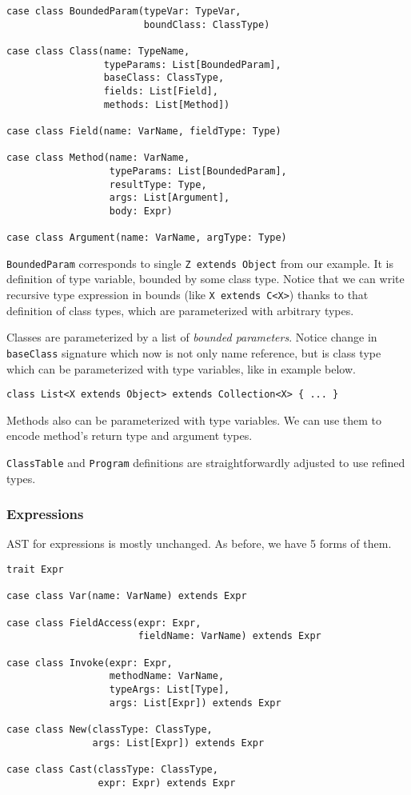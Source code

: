 \documentclass{article}[12pt]
\begin{document}
\begin{verbatim}
case class BoundedParam(typeVar: TypeVar,
                        boundClass: ClassType)

case class Class(name: TypeName,
                 typeParams: List[BoundedParam],
                 baseClass: ClassType,
                 fields: List[Field],
                 methods: List[Method])

case class Field(name: VarName, fieldType: Type)

case class Method(name: VarName,
                  typeParams: List[BoundedParam],
                  resultType: Type,
                  args: List[Argument],
                  body: Expr)
                  
case class Argument(name: VarName, argType: Type)
\end{verbatim}

\texttt{BoundedParam} corresponds to single
\texttt{Z extends Object} from our example. It is definition
of type variable, bounded by some class type. Notice that we
can write recursive type expression in bounds
(like \texttt{X extends C<X>}) thanks to that definition of class
types, which are parameterized with arbitrary types.

Classes are parameterized by a list of \emph{bounded parameters}.
Notice change in \texttt{baseClass} signature which now is not
only name reference, but is class type which can be parameterized
with type variables, like in example below.

\begin{verbatim}
class List<X extends Object> extends Collection<X> { ... }
\end{verbatim}

Methods also can be parameterized with type variables. We can use
them to encode method's return type and argument types.

\texttt{ClassTable} and \texttt{Program} definitions are
straightforwardly adjusted to use refined types.

\subsubsection{Expressions}

AST for expressions is mostly unchanged. As before, we have 5
forms of them.

\begin{verbatim}
trait Expr

case class Var(name: VarName) extends Expr

case class FieldAccess(expr: Expr,
                       fieldName: VarName) extends Expr

case class Invoke(expr: Expr,
                  methodName: VarName,
                  typeArgs: List[Type],
                  args: List[Expr]) extends Expr

case class New(classType: ClassType,
               args: List[Expr]) extends Expr

case class Cast(classType: ClassType,
                expr: Expr) extends Expr
\end{verbatim}
\end{document}
